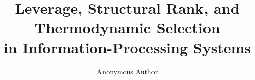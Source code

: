 \documentclass[acmtoplas,screen,review,anonymous]{acmart}
\theoremstyle{definition}
\theoremstyle{remark}
\begin{document}
\title{Leverage, Structural Rank, and Thermodynamic Selection\\in Information-Processing Systems}

\author{Anonymous Author}


\end{document}
